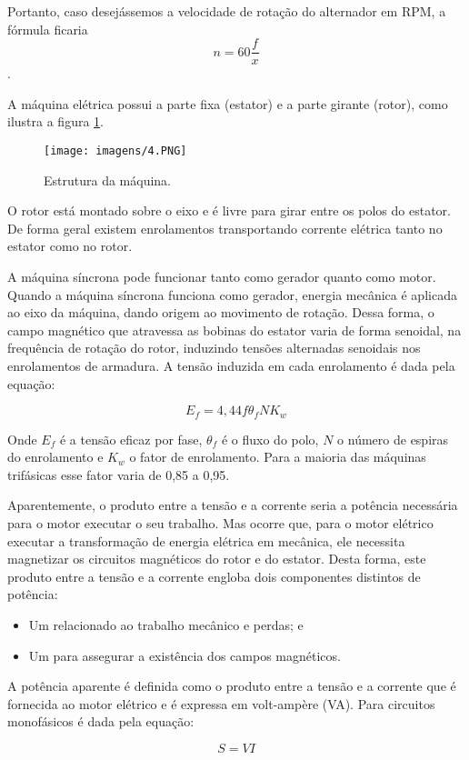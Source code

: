 Portanto, caso desejássemos a velocidade de rotação do alternador em RPM, a fórmula ficaria $$n = {60}\frac{f}{x}$$.

A máquina elétrica possui a parte fixa (estator) e a parte girante (rotor), como ilustra a figura \ref{fig:4}.

\begin{figure}[ht!]
\center 
\texttt{[image: imagens/4.PNG]}
\caption{Estrutura da máquina.}\label{fig:4}
\end{figure}

O rotor está montado sobre o eixo e é livre para girar entre os polos do estator. De forma geral existem enrolamentos transportando corrente elétrica tanto no estator como no rotor.

A máquina síncrona pode funcionar tanto como gerador quanto como motor. Quando a
máquina síncrona funciona como gerador, energia mecânica é aplicada ao eixo da máquina, dando origem ao movimento de rotação. Dessa forma, o campo magnético que atravessa as bobinas do estator varia de forma senoidal, na frequência de rotação do rotor, induzindo tensões alternadas senoidais nos enrolamentos de armadura. A tensão induzida em cada enrolamento é dada pela equação:

$$E_f = 4,44  {f}\theta_f {N}{K_{w}}$$

Onde $E_f$ é a tensão eficaz por fase, $\theta_f$ é o fluxo do polo, $N$ o número de espiras do enrolamento e $K_w$ o fator de enrolamento. Para a maioria das máquinas trifásicas esse fator varia de 0,85 a 0,95.

Aparentemente, o produto entre a tensão e a corrente seria a potência necessária para o
motor executar o seu trabalho. Mas ocorre que, para o motor elétrico executar a transformação de energia elétrica em mecânica, ele necessita magnetizar os circuitos magnéticos do rotor e do estator. Desta forma, este produto entre a tensão e a corrente engloba dois componentes distintos de potência: 
\begin{itemize}
\item Um relacionado ao trabalho mecânico e perdas; e
\item Um para assegurar a existência dos campos magnéticos.
\end{itemize}

A potência aparente é definida como o produto entre a tensão e a corrente que é fornecida ao motor elétrico e é expressa em volt-ampère (VA). Para circuitos monofásicos é dada pela equação:

$$S = VI$$

